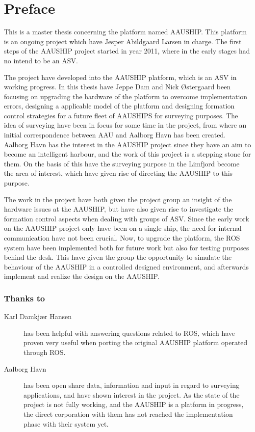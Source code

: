 \chapter{Preface}
This is a master thesis concerning the platform named AAUSHIP. This
platform is an ongoing project which have Jesper Abildgaard Larsen in
charge. The first steps of the AAUSHIP project started in year 2011,
where in the early stages had no intend to be an \acf{ASV}.

The project have developed into the AAUSHIP platform, which is an
\ac{ASV} in working progress. In this thesis have Jeppe Dam and Nick
Østergaard been focusing on upgrading the hardware of the platform to
overcome implementation errors, designing a applicable model of the
platform and designing formation control strategies for a future fleet
of AAUSHIPS for surveying purposes. The idea of surveying have been in
focus for some time in the project, from where an initial
correspondence between \acf{AAU} and Aalborg Havn has been created. Aalborg
Havn has the interest in the AAUSHIP project since they have an aim to
become an intelligent harbour, and the work of this project is a
stepping stone for them. On the basis of this have the surveying
purpose in the Limfjord become the area of interest, which have given
rise of directing the AAUSHIP to this purpose.

The work in the project have both given the project group an insight
of the hardware issues at the AAUSHIP, but have also given rise to
investigate the formation control aspects when dealing with groups of
\ac{ASV}. Since the early work on the AAUSHIP project only have been
on a single ship, the need for internal communication have not been
crucial. Now, to upgrade the platform, the ROS system have been
implemented both for future work but also for testing purposes behind
the desk. This have given the group the opportunity to simulate the
behaviour of the AAUSHIP in a controlled designed environment, and
afterwards implement and realize the design on the AAUSHIP.
\newpage

\subsection*{Thanks to}
\begin{description}
\item[Karl Damkjær Hansen] has been helpful with answering questions
	related to ROS, which have proven very useful when
	porting the original AAUSHIP platform operated through ROS. 
\item[Aalborg Havn] has been open share data, information and
	input in regard to surveying applications, and have shown interest in
	the project. As the state of the project is not fully working,
	and the AAUSHIP is a platform in progress, the direct corporation
	with them has not reached the implementation phase with their system
	yet.  
\end{description}



